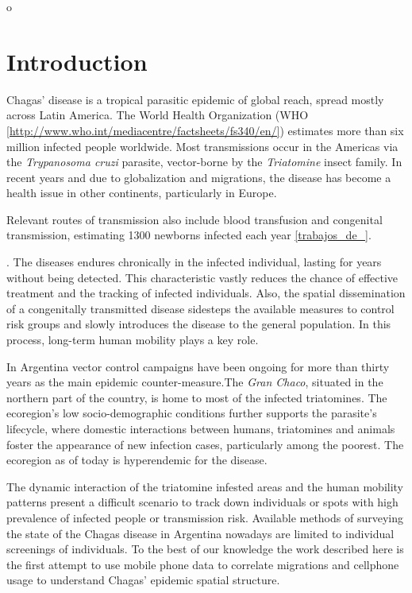 o\section{Introduction}

Chagas' disease is a tropical parasitic epidemic of global reach, spread mostly across Latin America. The World Health Organization (WHO \ref{http://www.who.int/mediacentre/factsheets/fs340/en/}) estimates more than six million infected people worldwide. Most transmissions occur in the Americas via the \textit{Trypanosoma cruzi} parasite, vector-borne by the \textit{Triatomine} insect family. In recent years and due to globalization and migrations, the disease has become a health issue in other continents, particularly in Europe. 

Relevant routes of transmission also include blood transfusion and congenital transmission, estimating 1300 newborns infected each year \ref{trabajos_de_}.\begin{comment}  en el drive estan las ppt del min salud \end{comment}. The diseases endures chronically in the infected individual, lasting for years without being detected. This characteristic vastly reduces the chance of effective treatment and the tracking of infected individuals. Also, the spatial dissemination of a congenitally transmitted disease sidesteps the available measures to control risk groups and slowly introduces the disease to the general population. In this process, long-term human mobility plays a key role.

In Argentina vector control campaigns have been ongoing for more than thirty years as the main epidemic counter-measure.The \textit{Gran Chaco}, situated in the northern part of the country, is home to most of the infected triatomines. The ecoregion's low socio-demographic conditions further supports the parasite's lifecycle, where domestic interactions between humans, triatomines and animals foster the appearance of new infection cases, particularly among the poorest. The ecoregion as of today is hyperendemic for the disease.

The dynamic interaction of the triatomine infested areas and the human mobility patterns present a difficult scenario to track down individuals or spots with high prevalence of infected people or  transmission risk. Available methods of surveying the state of the Chagas disease in Argentina nowadays are limited to individual screenings of individuals. To the best of our knowledge the work described here is the first attempt to use mobile phone data to correlate migrations and cellphone usage to understand Chagas’ epidemic spatial structure.

